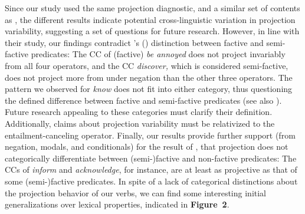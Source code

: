 \documentclass[12pt, a4paper]{article}
\newcommand{\posscite}[1]{\citeauthor{#1}'s (\citeyear{#1})}
\begin{document}

	Since our study used the same projection diagnostic, and a similar set of contents as \cite{sieker_projective_2022}, the different results indicate potential cross-linguistic variation in projection variability, suggesting a set of questions for future research. 
	However, in line with their study, our findings contradict \posscite{karttunen_observations_1971} distinction between factive and semi-factive predicates: The CC of (factive) \emph{be annoyed} does not project invariably from all four operators, and the CC \emph{discover,}  which is considered semi-factive, does not project more from under negation than the other three operators. The pattern we observed for {\em know} does not fit into either category,
	thus questioning the defined difference between factive and semi-factive predicates (see also \citealp{beaver_have_2010}).
	Future research appealing to these categories must clarify their definition. Additionally, claims about projection variability must be relativized to the entailment-canceling operator.
	Finally, our results provide further support (from negation, modals, and conditionals) for the result of \citet{degen_are_2022}, that projection does not categorically differentiate between (semi-)factive and non-factive predicates: The CCs of \emph{inform} and \emph{acknowledge}, for instance, are at least as projective as that of some (semi-)factive predicates.
	In spite of a lack of categorical distinctions about the projection behavior of our verbs, we can find some interesting initial generalizations over lexical properties, indicated in \textbf{Figure\ 2}.
	
\end{document}
